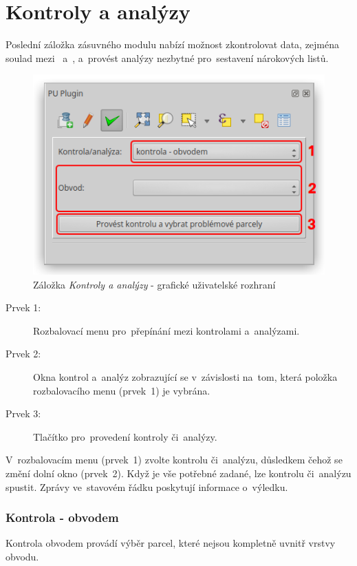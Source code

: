 \newpage

\section{Kontroly a analýzy}
\label{manual_kontroly_analyzy}

Poslední záložka zásuvného modulu nabízí možnost zkontrolovat data, zejména soulad mezi~ a~, a~provést analýzy nezbytné pro~sestavení nárokových listů.

	\begin{figure}[H]
		\centering
		\includegraphics[width=.55\textwidth]{./pictures/ca_gui.png}
		\caption[Záložka \textit{Kontroly a analýzy} - grafické uživatelské rozhraní]{Záložka \textit{Kontroly a analýzy} - grafické uživatelské rozhraní}
		\label{fig:manual_ca_gui}
 	\end{figure}

\begin{description}
	\item[Prvek 1:] Rozbalovací menu pro~přepínání mezi kontrolami a~analýzami.
	\item[Prvek 2:] Okna kontrol a~analýz zobrazující se v~závislosti na~tom, která položka rozbalovacího menu (prvek~1) je vybrána.
	\item[Prvek 3:] Tlačítko pro~provedení kontroly či~analýzy.
\end{description}

V~rozbalovacím menu (prvek~1) zvolte kontrolu či~analýzu, důsledkem čehož se změní dolní okno (prvek~2). Když je vše potřebné zadané, lze kontrolu či~analýzu spustit. Zprávy ve~stavovém řádku poskytují informace o~výledku.

\subsubsection{Kontrola - obvodem}
\label{manual_kontrola_obvodem}

Kontrola obvodem provádí výběr parcel, které nejsou kompletně uvnitř vrstvy obvodu.

